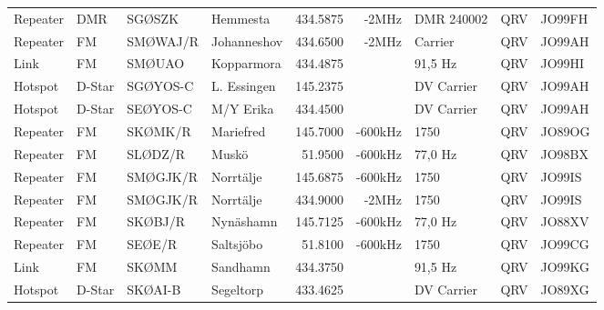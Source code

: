 \begin{landscape}
\begin{longtable}{llllrrlcl}
	Repeater           & DMR          & SGØSZK        & Hemmesta     &          434.5875 &          -2MHz & DMR 240002      &       QRV       & JO99FH           \\
	Repeater           & FM           & SMØWAJ/R      & Johanneshov  &          434.6500 &          -2MHz & Carrier         &       QRV       & JO99AH           \\
	Link               & FM           & SMØUAO        & Kopparmora   &          434.4875 &                & 91,5 Hz         &       QRV       & JO99HI           \\
	Hotspot            & D-Star       & SGØYOS-C      & L. Essingen  &          145.2375 &                & DV Carrier      &       QRV       & JO99AH           \\
	Hotspot            & D-Star       & SEØYOS-C      & M/Y Erika    &          434.4500 &                & DV Carrier      &       QRV       & JO99AH           \\
	Repeater           & FM           & SKØMK/R       & Mariefred    &          145.7000 &        -600kHz & 1750            &       QRV       & JO89OG           \\
	Repeater           & FM           & SLØDZ/R       & Muskö        &           51.9500 &        -600kHz & 77,0 Hz         &       QRV       & JO98BX           \\
	Repeater           & FM           & SMØGJK/R      & Norrtälje    &          145.6875 &        -600kHz & 1750            &       QRV       & JO99IS           \\
	Repeater           & FM           & SMØGJK/R      & Norrtälje    &          434.9000 &          -2MHz & 1750            &       QRV       & JO99IS           \\
	Repeater           & FM           & SKØBJ/R       & Nynäshamn    &          145.7125 &        -600kHz & 77,0 Hz         &       QRV       & JO88XV           \\
	Repeater           & FM           & SEØE/R        & Saltsjöbo    &           51.8100 &        -600kHz & 1750            &       QRV       & JO99CG           \\
	Link               & FM           & SKØMM         & Sandhamn     &          434.3750 &                & 91,5 Hz         &       QRV       & JO99KG           \\
	Hotspot            & D-Star       & SKØAI-B       & Segeltorp    &          433.4625 &                & DV Carrier      &       QRV       & JO89XG           \\

\end{longtable}
\end{landscape}

